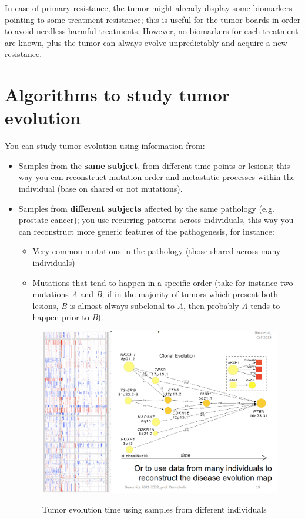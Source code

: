   In case of primary resistance, the tumor might already display some biomarkers
  pointing to some treatment resistance; this is useful for the tumor boards in
  order to avoid needless harmful treatments. However, no biomarkers for each
  treatment are known, plus the tumor can always evolve unpredictably and
  acquire a new resistance. 


\section{Algorithms to study tumor evolution}
  
  You can study tumor evolution using information from:
  \begin{itemize}
    \item Samples from the \textbf{same subject}, from different time points or
    lesions; this way you can reconstruct mutation order and metastatic
    processes within the individual (base on shared or not mutations). 
    \item Samples from \textbf{different subjects} affected by the same
    pathology (e.g. prostate cancer); you use recurring patterns across
    individuals, this way you can reconstruct more generic features of the
    pathogenesis, for instance:
    \begin{itemize}
      \item Very common mutations in the pathology (those shared across many
      individuals)
      \item Mutations that tend to happen in a specific order (take for instance
      two mutations \textit{A} and \textit{B}; if in the majority of tumors
      which present both lesions, \textit{B} is almost always subclonal to
      \textit{A}, then probably \textit{A} tends to happen prior to \textit{B}).
    \end{itemize}
    \begin{figure}[ht]
      \caption{Tumor evolution time using samples from different individuals}
      \centering
      \includegraphics[width=1\textwidth]{image_10.PNG}
      \label{fig: tumor evol algorithm}
    \end{figure}
  \end{itemize}

